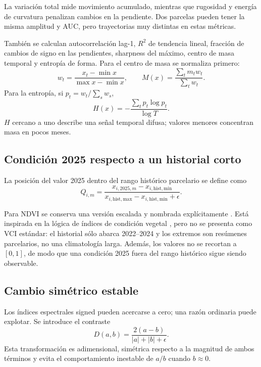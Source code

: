 La variación total mide movimiento acumulado, mientras que rugosidad y energía de curvatura
penalizan cambios en la pendiente. Dos parcelas pueden tener la misma amplitud y AUC, pero
trayectorias muy distintas en estas métricas.

También se calculan autocorrelación lag-1, $R^2$ de tendencia lineal, fracción de cambios de
signo en las pendientes, sharpness del máximo, centro de masa temporal y entropía de forma.
Para el centro de masa se normaliza primero:
\[
w_t=\frac{x_t-\min x}{\max x-\min x},
\qquad
M(x)=\frac{\sum_t m_t w_t}{\sum_t w_t}.
\]
Para la entropía, si $p_t=w_t/\sum_s w_s$,
\[
H(x)=-\frac{\sum_t p_t\log p_t}{\log T}.
\]
$H$ cercano a uno describe una señal temporal difusa; valores menores concentran masa en
pocos meses.

\subsection{Condición 2025 respecto a un historial corto}

La posición del valor 2025 dentro del rango histórico parcelario se define como
\begin{equation}
Q_{i,m}
=
\frac{x_{i,2025,m}-x_{i,\mathrm{hist,min}}}
{x_{i,\mathrm{hist,max}}-x_{i,\mathrm{hist,min}}+\epsilon}.
\label{eq:hist-position}
\end{equation}

Para NDVI se conserva una versión escalada y nombrada explícitamente
. Está inspirada en la lógica de índices de condición vegetal
\citep{Bokusheva2016,Serban2025}, pero no se presenta como VCI estándar: el historial sólo
abarca 2022--2024 y los extremos son resúmenes parcelarios, no una climatología larga.
Además, los valores no se recortan a $[0,1]$, de modo que una condición 2025 fuera del rango
histórico sigue siendo observable.

\subsection{Cambio simétrico estable}

Los índices espectrales signed pueden acercarse a cero; una razón ordinaria puede explotar.
Se introduce el contraste
\begin{equation}
D(a,b)=\frac{2(a-b)}{|a|+|b|+\epsilon}.
\label{eq:symmetric-change}
\end{equation}
Esta transformación es adimensional, simétrica respecto a la magnitud de ambos términos y
evita el comportamiento inestable de $a/b$ cuando $b\approx0$.

